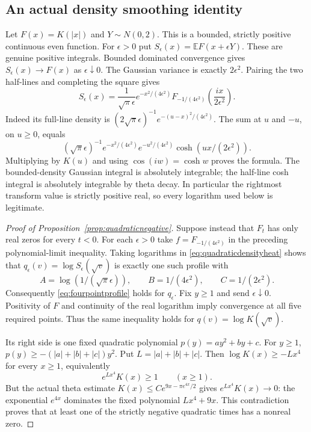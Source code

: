 \documentclass[11pt]{article}
\begin{document}
\subsection*{An actual density smoothing identity}
Let $F(x)=K(|x|)$ and $Y\sim N(0,2)$. This is a bounded, strictly
positive continuous even function. For $\epsilon>0$ put
$S_\epsilon(x)=\mathbb E F(x+\epsilon Y)$. These are genuine positive
integrals. Bounded dominated convergence gives
$S_\epsilon(x)\to F(x)$ as $\epsilon\downarrow0$.
The Gaussian variance is exactly $2\epsilon^2$. Pairing the two
half-lines and completing the square gives
\begin{equation}\label{eq:quadraticdensityheat}
 S_\epsilon(x)=\frac{1}{\sqrt\pi\epsilon}
 e^{-x^2/(4\epsilon^2)}
 F_{-1/(4\epsilon^2)}\left(\frac{ix}{2\epsilon^2}\right).
\end{equation}
Indeed its full-line density is
$(2\sqrt\pi\epsilon)^{-1}e^{-(u-x)^2/(4\epsilon^2)}$.
The sum at $u$ and $-u$, on $u\geq0$, equals
\[
 (\sqrt\pi\epsilon)^{-1}e^{-x^2/(4\epsilon^2)}
 e^{-u^2/(4\epsilon^2)}\cosh(ux/(2\epsilon^2)).
\]
Multiplying by $K(u)$ and using $\cos(iw)=\cosh w$ proves the formula.
The bounded-density Gaussian integral is absolutely integrable;
the half-line cosh integral is absolutely integrable by theta decay.
In particular the rightmost transform value is strictly positive real,
so every logarithm used below is legitimate.

\begin{proof}[Proof of Proposition~\ref{prop:quadraticnegative}]
Suppose instead that $F_t$ has only real zeros for every $t<0$.
For each $\epsilon>0$ take $f=F_{-1/(4\epsilon^2)}$ in the preceding
polynomial-limit inequality. Taking logarithms in
\eqref{eq:quadraticdensityheat} shows that
$q_\epsilon(v)=\log S_\epsilon(\sqrt v)$ is exactly one such profile
with
\[
 A=\log(1/(\sqrt\pi\epsilon)),\qquad
 B=1/(4\epsilon^2),\qquad C=1/(2\epsilon^2).
\]
Consequently \eqref{eq:fourpointprofile} holds for $q_\epsilon$.
Fix $y\geq1$ and send $\epsilon\downarrow0$. Positivity of $F$ and
continuity of the real logarithm imply convergence at all five required
points. Thus the same inequality holds for
$q(v)=\log K(\sqrt v)$.

Its right side is one fixed quadratic polynomial $p(y)=ay^2+by+c$.
For $y\geq1$,
$p(y)\geq-(|a|+|b|+|c|)y^2$. Put $L=|a|+|b|+|c|$.
Then $\log K(x)\geq-Lx^4$ for every $x\geq1$, equivalently
\[
 e^{Lx^4}K(x)\geq1\qquad(x\geq1).
\]
But the actual theta estimate $K(x)\leq C e^{9x-\pi e^{4x}/2}$
gives $e^{Lx^4}K(x)\to0$: the exponential $e^{4x}$ dominates the
fixed polynomial $Lx^4+9x$. This contradiction proves that at least
one of the strictly negative quadratic times has a nonreal zero.
\end{proof}
\end{document}
